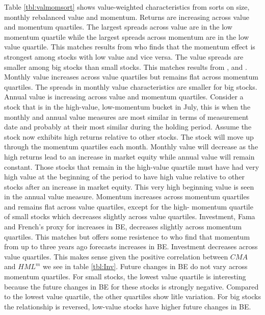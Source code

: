 Table \ref{tbl:valmomsort} shows value-weighted characteristics from sorts on size,
monthly rebalanced value and momentum. Returns are increasing across value and momentum
quartiles. The largest spreads across value are in the low momentum quartile while the
largest spreads across momentum are in the low value quartile. This matches results from
\textcite{asness1997interaction} who finds that the momentum effect is strongest among
stocks with low value and vice versa. The value spreads are smaller among big stocks than
small stocks. This matches results from \textcite{loughran1997book},
\textcite{asness2015fact} and \textcite{kok2017facts}. Monthly value increases across
value quartiles but remains flat across momentum quartiles. The spreads in monthly value
characteristics are smaller for big stocks. Annual value is increasing across value and
momentum quartiles. Consider a stock that is in the high-value, low-momentum bucket in
July, this is when the monthly and annual value measures are most similar in terms of
measurement date and probably at their most similar during the holding period. Assume the
stock now exhibits high returns relative to other stocks. The stock will move up through
the momentum quartiles each month. Monthly value will decrease as the high returns lead to
an increase in market equity while annual value will remain constant. Those stocks that
remain in the high-value quartile must have had very high value at the beginning of the
period to have high value relative to other stocks after an increase in market equity.
This very high beginning value is seen in the annual value measure. Momentum increases
across momentum quartiles and remains flat across value quartiles, except for the high-
momentum quartile of small stocks which decreases slightly across value quartiles.
Investment, Fama and French's proxy for increases in BE, decreases slightly across
momentum quartiles. This matches \textcite{fama2016dissecting} but offers some resistence
to \textcite{asness2013devil} who find that momentum from up to three years ago forecasts
increases in BE. Investment decreases across value quartiles. This makes sense given the
positive correlation between $CMA$ and $HML^m$ we see in table \ref{tbl:Inv}. Future
changes in BE do not vary across momentum quartiles. For small stocks, the lowest value
quartile is interesting because the future changes in BE for these stocks is strongly
negative. Compared to the lowest value quartile, the other quartiles show litle variation.
For big stocks the relationship is reversed, low-value stocks have higher future changes
in BE.


